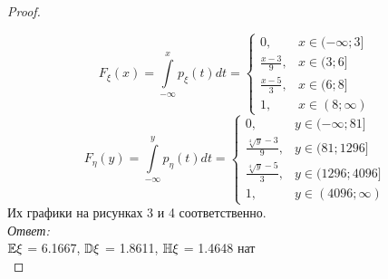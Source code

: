 \begin{proof}
\begin{figure}[h!]
    \caption{}
    \label{fig:enter-label}
\end{figure}
\[
F_{\xi}(x) = \int\limits_{-\infty}^xp_{\xi}(t)dt = \begin{cases}
    0, & x\in (-\infty;3]\\
    \frac{x-3}{9}, & x\in (3; 6]\\
    \frac{x-5}{3}, & x\in (6; 8]\\
    1, & x\in (8;\infty)
\end{cases}
\]
\[
F_{\eta}(y) = \int\limits_{-\infty}^yp_{\eta}(t)dt = \begin{cases}
    0, & y\in (-\infty;81]\\
    \frac{\sqrt[4]y-3}{9}, & y\in (81; 1296]\\
    \frac{\sqrt[4]y-5}{3}, & y\in (1296; 4096]\\
    1, & y\in (4096;\infty)
\end{cases}
\]
Их графики на рисунках 3 и 4 соответственно.\\
{\it Ответ:}\\
$\mathbb E\xi$ = 6.1667, $\mathbb D\xi$ = 1.8611, $\mathbb H\xi$ = 1.4648 нат\\
\end{proof}